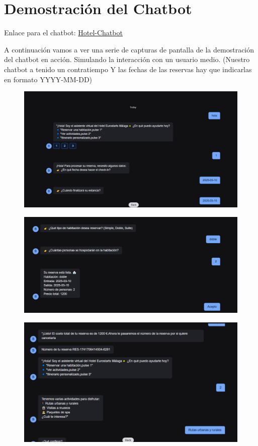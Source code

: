 \documentclass[12pt]{article}
\begin{document}
\section{Demostración del Chatbot}

Enlace para el chatbot: \href{https://cdn.botpress.cloud/webchat/v2.2/shareable.html?configUrl=https://files.bpcontent.cloud/2025/02/20/18/20250220181209-C0YQTWRL.json}{Hotel-Chatbot}

A continuación vamos a ver una serie de capturas de pantalla de la demostración del chatbot en acción.
Simulando la interacción con un usuario medio. (Nuestro chatbot a tenido un contratiempo Y
las fechas de las reservas hay que indicarlas en formato YYYY-MM-DD)

\begin{figure}[h!]
    \centering
    \includegraphics[width=.6\textwidth]{assets/ejemplo/conver-1.PNG}
    \label{fig:my_label}
\end{figure}

\begin{figure}[h!]
    \centering
    \includegraphics[width=.6\textwidth]{assets/ejemplo/conver-2.PNG}
    \label{fig:my_label}
\end{figure}

\begin{figure}[h!]
    \centering
    \includegraphics[width=.6\textwidth]{assets/ejemplo/conver-3.PNG}
    \label{fig:my_label}
\end{figure}
\end{document}
